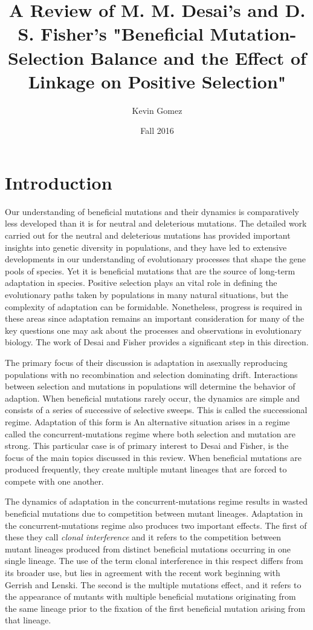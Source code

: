 \documentclass[12pt, one column]{article}
\title{A Review of M. M. Desai's and D. S. Fisher's "Beneficial Mutation-Selection Balance and the Effect of Linkage on Positive Selection"}
\date{Fall 2016}
\author{Kevin Gomez}
\begin{document}
\maketitle
\newpage


\newpage
\section*{Introduction}
Our understanding of beneficial mutations and their dynamics is comparatively less developed than it is for neutral and deleterious mutations.  The detailed work carried out for the neutral and deleterious mutations has provided important insights into genetic diversity in populations, and they have led to extensive developments in our understanding of evolutionary processes that shape the gene pools of species.  Yet it is beneficial mutations that are the source of long-term adaptation in species.  Positive selection plays an vital role in defining the evolutionary paths taken by populations in many natural situations, but the complexity of adaptation can be formidable.  Nonetheless, progress is required in these areas since adaptation remains an important consideration for many of the key questions one may ask about the processes and observations in evolutionary biology.  The work of Desai and Fisher provides a significant step in this direction.

The primary focus of their discussion is adaptation in asexually reproducing populations with no recombination and selection dominating drift.  Interactions between selection and mutations in populations will determine the behavior of adaption.  When beneficial mutations rarely occur, the dynamics are simple and consists of a series of successive of selective sweeps.  This is called the successional regime.  Adaptation of this form is An alternative situation arises in a regime called the concurrent-mutations regime where both selection and mutation are strong.  This particular case is of primary interest to Desai and Fisher, is the focus of the main topics discussed in this review.  When beneficial mutations are produced frequently, they create multiple mutant lineages that are forced to compete with one another.  

The dynamics of adaptation in the concurrent-mutations regime results in wasted beneficial mutations due to competition between mutant lineages.   Adaptation in the concurrent-mutations regime also produces two important effects.  The first of these they call \textit{clonal interference} and it refers to the competition between mutant lineages produced from distinct beneficial mutations occurring in one single lineage.  The use of the term clonal interference in this respect differs from its broader use, but lies in agreement with the recent work beginning with Gerrish and Lenski.  The second is the multiple mutations effect, and it refers to the appearance of mutants with multiple beneficial mutations originating from the same lineage prior to the fixation of the first beneficial mutation arising from that lineage.    
\end{document}

